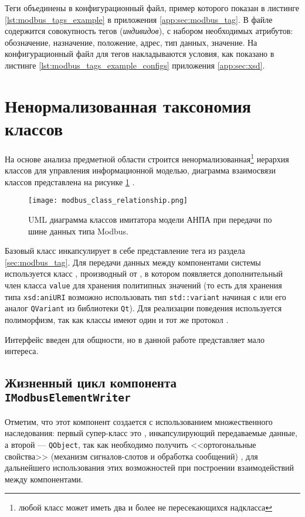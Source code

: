 Теги объединены в конфигурационный файл, пример которого показан 
в листинге \ref{lst:modbus_tags_example} в приложения \ref{app:sec:modbus_tag}.
В файле содержится совокупность тегов (\textit{индивидов}),
с набором необходимых атрибутов: обозначение, назначение, положение, адрес, тип данных, значение.
На конфигурационный файл для тегов накладываются условия,
как показано в листинге \ref{lst:modbus_tags_example_configs} приложения \ref{app:sec:xsd}.


\section{Ненормализованная таксономия классов}\label{sec:writers_relationship}

На основе анализа предметной области строится ненормализованная\footnote{любой класс может иметь два и более не пересекающихся надкласса}
иерархия классов для управления информационной моделью,
диаграмма взаимосвязи классов представлена на рисунке \ref{fig:modbus_class_uml} \cite[стр. 223]{book:oop:oop_analize}.
\begin{landscape}\begin{figure}[h!]\begin{center}
    \texttt{[image: modbus\_class\_relationship.png]}
    \caption[Иерархия классов имитатора]
        {UML диаграмма классов имитатора модели АНПА при передачи по шине данных типа Modbus.}
            \label{fig:modbus_class_uml}
\end{center}\end{figure}\end{landscape}

Базовый класс \mbelement инкапсулирует в себе представление тега из раздела \ref{sec:modbus_tag}.
Для передачи данных между компонентами системы используется класс \mbdata, производный от \mbelement,
в котором появляется дополнительный член класса \texttt{value} для хранения политипных значений
(то есть для хранения типа \texttt{xsd:aniURI} возможно использовать тип \texttt{std::variant} начиная с \cppseventeen
или его аналог \texttt{QVariant} из библиотеки \texttt{Qt}).
Для реализации поведения используется полиморфизм, так как классы имеют один и тот же протокол \cite[стр. 133]{book:oop:oop_analize}.

Интерфейс \mbreader введен для общности, но в данной работе представляет мало интереса.

\subsection{Жизненный цикл компонента \texttt{IModbusElementWriter}}
Отметим, что этот компонент создается с использованием множественного наследования:
первый супер-класс это \mbdata, инкапсулирующий передаваемые данные,
а второй --- \texttt{QObject}, так как необходимо получить <<ортогональные свойства>>
(механизм сигналов-слотов и обработка сообщений) \cite[стр. 134]{book:oop:oop_analize},
для дальнейшего использования этих возможностей при построении взаимодействий между компонентами.

